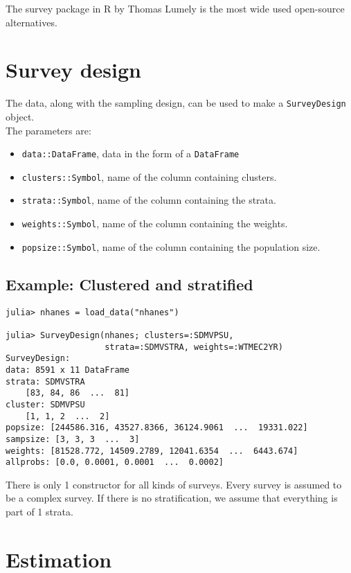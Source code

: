 \documentclass{juliacon}
\begin{document}
The survey package in R by Thomas Lumely \cite{lumley2004analysis} is the most wide used open-source alternatives. 



\section{Survey design}

The data, along with the sampling design, can be used to make a \verb|SurveyDesign| object.
\\
The parameters are:
 
\begin{itemize}
    \item \verb|data::DataFrame|, data in the form of a \verb|DataFrame|
    \item \verb|clusters::Symbol|, name of the column containing clusters.
    \item \verb|strata::Symbol|, name of the column containing the strata.
    \item \verb|weights::Symbol|, name of the column containing the weights.
    \item \verb|popsize::Symbol|, name of the column containing the population size. 
\end{itemize}

\subsection{Example: Clustered and stratified}

\begin{lstlisting}
julia> nhanes = load_data("nhanes")

julia> SurveyDesign(nhanes; clusters=:SDMVPSU,
                    strata=:SDMVSTRA, weights=:WTMEC2YR)
SurveyDesign:
data: 8591 x 11 DataFrame
strata: SDMVSTRA
    [83, 84, 86  ...  81]
cluster: SDMVPSU
    [1, 1, 2  ...  2]
popsize: [244586.316, 43527.8366, 36124.9061  ...  19331.022]
sampsize: [3, 3, 3  ...  3]
weights: [81528.772, 14509.2789, 12041.6354  ...  6443.674]
allprobs: [0.0, 0.0001, 0.0001  ...  0.0002]
\end{lstlisting}

There is only 1 constructor for all kinds of surveys. Every survey is assumed to be a complex survey. If there is no stratification, we assume that everything is part of 1 strata. 

\section{Estimation}
\end{document}
